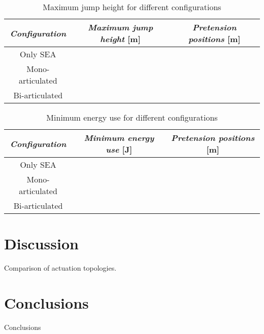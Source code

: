 \documentclass[letterpaper, 10 pt, conference]{ieeeconf}  %
\begin{document}
\begin{table}[h]
	\caption{Maximum jump height for different configurations}
	\label{maxheight}
	\begin{center}
		\begin{tabular}{c||c|c}
		\textit{Configuration}	& \textit{Maximum jump height} [m] & \textit{Pretension positions} [m]\\
			\hline
			Only SEA &  & \\
			\hline
			Mono-articulated & & \\
			\hline
			Bi-articulated & &
		\end{tabular}
	\end{center}
\end{table}

\begin{table}[h]
	\caption{Minimum energy use for different configurations}
	\label{minenergy}
	\begin{center}
		\begin{tabular}{c||c|c}
			\textit{Configuration}	& \textit{Minimum energy use} [J] & \textit{Pretension positions} [m] \\
			\hline
			Only SEA &   &\\
			\hline
			Mono-articulated &  &\\
			\hline
			Bi-articulated & &
		\end{tabular}
	\end{center}
\end{table}

\section{Discussion} \label{sec:discussion}

Comparison of actuation topologies.

\section{Conclusions} \label{sec:conclusions}

Conclusions


\addtolength{\textheight}{-12cm}   %
\end{document}

